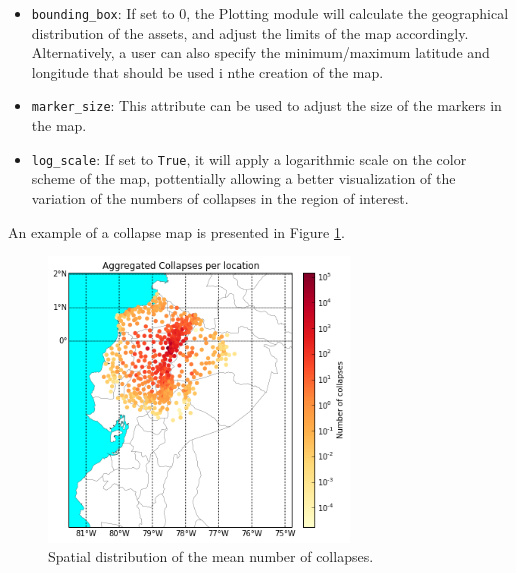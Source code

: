 \begin{itemize}
\item \verb=bounding_box=: If set to 0, the Plotting module will calculate the geographical distribution of the assets, and adjust the limits of the map accordingly. Alternatively, a user can also specify the minimum/maximum latitude and longitude that should be used i nthe creation of the map.
\item \verb=marker_size=: This attribute can be used to adjust the size of the markers in the map.
\item \verb=log_scale=: If set to \verb=True=, it will apply a logarithmic scale on the color scheme of the map, pottentially allowing a better visualization of the variation of the numbers of collapses in the region of interest.\\
\end{itemize}

An example of a collapse map is presented in Figure \ref{fig:collapse_map}.

\begin{figure}[htb]
  \centering
      \includegraphics[width=8cm]{Figures/collapse_map.png}
  \caption{Spatial distribution of the mean number of collapses.}
  \label{fig:collapse_map}
\end{figure}
